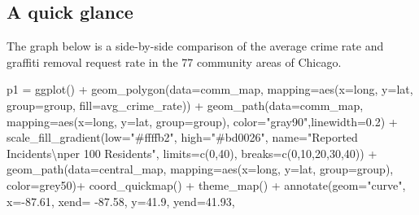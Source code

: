 \documentclass[
]{report}
\newenvironment{Shaded}{}{}
\newcommand{\AttributeTok}[1]{\textcolor[rgb]{0.84,0.23,0.29}{#1}}
\newcommand{\DecValTok}[1]{\textcolor[rgb]{0.00,0.36,0.77}{#1}}
\newcommand{\FloatTok}[1]{\textcolor[rgb]{0.00,0.36,0.77}{#1}}
\newcommand{\FunctionTok}[1]{\textcolor[rgb]{0.44,0.26,0.76}{#1}}
\newcommand{\NormalTok}[1]{\textcolor[rgb]{0.14,0.16,0.18}{#1}}
\newcommand{\OtherTok}[1]{\textcolor[rgb]{0.44,0.26,0.76}{#1}}
\newcommand{\SpecialCharTok}[1]{\textcolor[rgb]{0.00,0.36,0.77}{#1}}
\newcommand{\StringTok}[1]{\textcolor[rgb]{0.01,0.18,0.38}{#1}}
\begin{document}
\hypertarget{a-quick-glance}{%
\subsection{A quick glance}\label{a-quick-glance}}

The graph below is a side-by-side comparison of the average crime rate
and graffiti removal request rate in the 77 community areas of Chicago.

\begin{Shaded}
\begin{Highlighting}[]
\NormalTok{p1 }\OtherTok{=} \FunctionTok{ggplot}\NormalTok{() }\SpecialCharTok{+}
  \FunctionTok{geom\_polygon}\NormalTok{(}\AttributeTok{data=}\NormalTok{comm\_map, }\AttributeTok{mapping=}\FunctionTok{aes}\NormalTok{(}\AttributeTok{x=}\NormalTok{long, }\AttributeTok{y=}\NormalTok{lat, }\AttributeTok{group=}\NormalTok{group, }\AttributeTok{fill=}\NormalTok{avg\_crime\_rate)) }\SpecialCharTok{+}
  \FunctionTok{geom\_path}\NormalTok{(}\AttributeTok{data=}\NormalTok{comm\_map, }\AttributeTok{mapping=}\FunctionTok{aes}\NormalTok{(}\AttributeTok{x=}\NormalTok{long, }\AttributeTok{y=}\NormalTok{lat, }\AttributeTok{group=}\NormalTok{group), }\AttributeTok{color=}\StringTok{"gray90"}\NormalTok{,}\AttributeTok{linewidth=}\FloatTok{0.2}\NormalTok{) }\SpecialCharTok{+}
  \FunctionTok{scale\_fill\_gradient}\NormalTok{(}\AttributeTok{low=}\StringTok{"\#ffffb2"}\NormalTok{, }\AttributeTok{high=}\StringTok{"\#bd0026"}\NormalTok{,}
                      \AttributeTok{name=}\StringTok{"Reported Incidents}\SpecialCharTok{\textbackslash{}n}\StringTok{per 100 Residents"}\NormalTok{,}
                      \AttributeTok{limits=}\FunctionTok{c}\NormalTok{(}\DecValTok{0}\NormalTok{,}\DecValTok{40}\NormalTok{),}
                      \AttributeTok{breaks=}\FunctionTok{c}\NormalTok{(}\DecValTok{0}\NormalTok{,}\DecValTok{10}\NormalTok{,}\DecValTok{20}\NormalTok{,}\DecValTok{30}\NormalTok{,}\DecValTok{40}\NormalTok{)) }\SpecialCharTok{+}
  \FunctionTok{geom\_path}\NormalTok{(}\AttributeTok{data=}\NormalTok{central\_map, }\AttributeTok{mapping=}\FunctionTok{aes}\NormalTok{(}\AttributeTok{x=}\NormalTok{long, }\AttributeTok{y=}\NormalTok{lat, }\AttributeTok{group=}\NormalTok{group), }\AttributeTok{color=}\StringTok{\textquotesingle{}grey50\textquotesingle{}}\NormalTok{)}\SpecialCharTok{+}
  \FunctionTok{coord\_quickmap}\NormalTok{() }\SpecialCharTok{+}
  \FunctionTok{theme\_map}\NormalTok{() }\SpecialCharTok{+}
  \FunctionTok{annotate}\NormalTok{(}\AttributeTok{geom=}\StringTok{"curve"}\NormalTok{, }\AttributeTok{x=}\SpecialCharTok{{-}}\FloatTok{87.61}\NormalTok{, }\AttributeTok{xend=} \SpecialCharTok{{-}}\FloatTok{87.58}\NormalTok{, }\AttributeTok{y=}\FloatTok{41.9}\NormalTok{, }\AttributeTok{yend=}\FloatTok{41.93}\NormalTok{,}

\end{Highlighting}
\end{Shaded}
\end{document}
